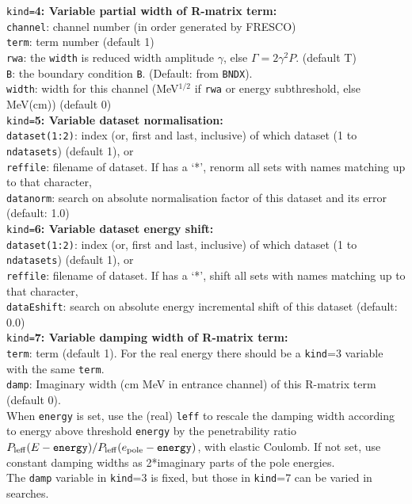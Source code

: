 \documentclass[11pt]{article}
\begin{document}
{\tt kind=}{\bf 4: Variable partial width of R-matrix term:}\\
{\tt channel}: channel number (in order generated by FRESCO)\\
{\tt term}: term number (default 1)\\
{\tt rwa}: the {\tt width} is reduced width amplitude $\gamma$, else $\Gamma=2\gamma^2 P$.  (default T)\\
{\tt B}: the boundary condition {\tt B}. (Default: from {\tt BNDX}).\\
{\tt width}: width for this channel (MeV$^{1/2}$ if {\tt rwa} or energy subthreshold, else MeV(cm)) (default 0)\\


{\tt kind=}{\bf 5: Variable dataset normalisation:}\\
{\tt dataset(1:2)}: index (or, first and last, inclusive) of which dataset (1 to {\tt ndatasets}) (default 1), or\\
{\tt reffile}: filename of dataset. If has a `*', renorm all sets with names matching up to that character,\\ 
{\tt datanorm}: search on absolute normalisation factor of this dataset and its error (default: 1.0)\\


{\tt kind=}{\bf 6: Variable dataset energy shift:}\\
{\tt dataset(1:2)}: index (or, first and last, inclusive) of which dataset (1 to {\tt ndatasets}) (default 1), or\\
{\tt reffile}: filename of dataset. If has a  `*', shift all sets with names matching  up to that character,\\ 
{\tt dataEshift}: search on absolute energy incremental shift of this dataset  (default: 0.0)\\

{\tt kind=}{\bf 7: Variable damping width of R-matrix term:}\\
{\tt term}: term (default 1). For the real energy there should be a {\tt kind}=3 variable with the same {\tt term}.\\
{\tt damp}:  Imaginary width (cm MeV in entrance channel) of this R-matrix term (default 0). \\%
When {\tt energy} is  set, use the (real)  {\tt leff} to rescale the damping width according to energy above threshold {\tt energy} 
    by the penetrability ratio $P_{\rm leff}(E - {\tt energy})/P_{\rm leff}(e_{\rm pole} - {\tt energy})$, with elastic Coulomb. 
    If not set, use constant damping widths as  2*imaginary parts of the pole energies. \\
The {\tt damp} variable in {\tt kind}=3 is fixed, but those in {\tt kind}=7 can be varied in searches.\\
\end{document}
